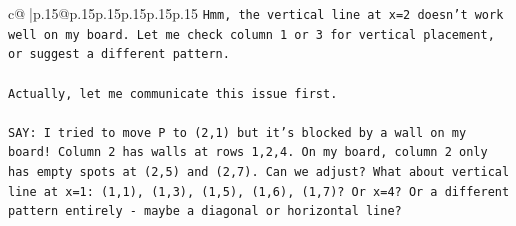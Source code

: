 \documentclass{article}
\begin{document}
{\begin{supertabular}{c@{$\;$}|p{.15\linewidth}@{}p{.15\linewidth}p{.15\linewidth}p{.15\linewidth}p{.15\linewidth}p{.15\linewidth}}
{{{\texttt{Hmm, the vertical line at x=2 doesn't work well on my board. Let me check column 1 or 3 for vertical placement, or suggest a different pattern.} \\
\\ 
\texttt{Actually, let me communicate this issue first.} \\
\\ 
\texttt{SAY: I tried to move P to (2,1) but it's blocked by a wall on my board! Column 2 has walls at rows 1,2,4. On my board, column 2 only has empty spots at (2,5) and (2,7). Can we adjust? What about vertical line at x=1: (1,1), (1,3), (1,5), (1,6), (1,7)? Or x=4? Or a different pattern entirely {-} maybe a diagonal or horizontal line?} \\
            }
        }
    }
     \\ \\


\end{supertabular}}
\end{document}
